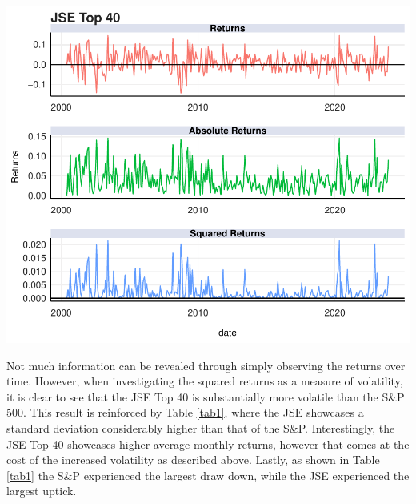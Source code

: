 \documentclass[11pt,preprint, authoryear]{elsarticle}
\let\origfigure\figure
\let\endorigfigure\endfigure
\renewenvironment{figure}[1][2] {
    \expandafter\origfigure\expandafter[H]
} {
    \endorigfigure
}
\numberwithin{equation}{section}
\numberwithin{figure}{section}
\numberwithin{table}{section}
\begin{document}
\begin{figure}[H]

{\centering \includegraphics{Template_files/figure-latex/Figure2-1} 

}

\caption{JSE Top 40 Returns \label{Figure2}}\label{fig:Figure2}
\end{figure}

Not much information can be revealed through simply observing the
returns over time. However, when investigating the squared returns as a
measure of volatility, it is clear to see that the JSE Top 40 is
substantially more volatile than the S\&P 500. This result is reinforced
by Table \ref{tab1}, where the JSE showcases a standard deviation
considerably higher than that of the S\&P. Interestingly, the JSE Top 40
showcases higher average monthly returns, however that comes at the cost
of the increased volatility as described above. Lastly, as shown in
Table \ref{tab1} the S\&P experienced the largest draw down, while the
JSE experienced the largest uptick.
\end{document}
